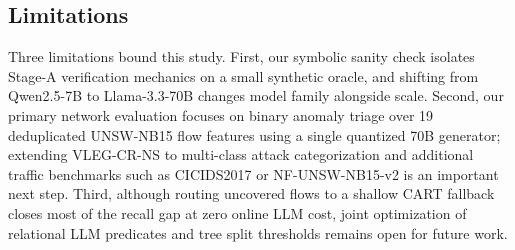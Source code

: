 \documentclass[11pt,letterpaper,onecolumn]{article}
\begin{document}
\subsection{Limitations}
\label{sec:limitations}
Three limitations bound this study. First, our symbolic sanity check isolates Stage-A verification mechanics on a small synthetic oracle, and shifting from Qwen2.5-7B to Llama-3.3-70B changes model family alongside scale. Second, our primary network evaluation focuses on binary anomaly triage over 19 deduplicated UNSW-NB15 flow features using a single quantized 70B generator; extending VLEG-CR-NS to multi-class attack categorization and additional traffic benchmarks such as CICIDS2017 \cite{sharafaldin2018cicids} or NF-UNSW-NB15-v2 is an important next step. Third, although routing uncovered flows to a shallow CART fallback closes most of the recall gap at zero online LLM cost, joint optimization of relational LLM predicates and tree split thresholds remains open for future work.
\end{document}
